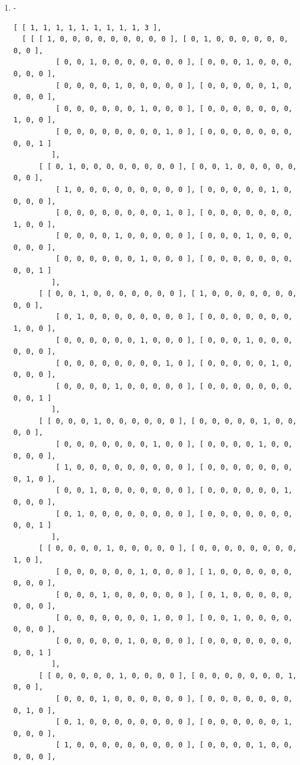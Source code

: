 \documentclass[a4paper, 10pt]{book}
\theoremstyle{definition}
\numberwithin{equation}{chapter}
\begin{document}
\begin{appendices}
\begin{enumerate}
\begin{lstlisting}[numbers=none]
          [ 0, 0, 0, 0, 0, 0, 0, 1, 0 ], [ 1, 1, 0, 0, 1, 0, 0, 0, 0 ], 
          [ 0, 0, 1, 1, 0, 0, 0, 1, 0 ] ] ] ]
	\end{lstlisting}
	\item -\begin{lstlisting}[numbers=none]
[ [ 1, 1, 1, 1, 1, 1, 1, 1, 1, 3 ], 
  [ [ [ 1, 0, 0, 0, 0, 0, 0, 0, 0, 0 ], [ 0, 1, 0, 0, 0, 0, 0, 0, 0, 0 ], 
          [ 0, 0, 1, 0, 0, 0, 0, 0, 0, 0 ], [ 0, 0, 0, 1, 0, 0, 0, 0, 0, 0 ],
          [ 0, 0, 0, 0, 1, 0, 0, 0, 0, 0 ], [ 0, 0, 0, 0, 0, 1, 0, 0, 0, 0 ],
          [ 0, 0, 0, 0, 0, 0, 1, 0, 0, 0 ], [ 0, 0, 0, 0, 0, 0, 0, 1, 0, 0 ],
          [ 0, 0, 0, 0, 0, 0, 0, 0, 1, 0 ], [ 0, 0, 0, 0, 0, 0, 0, 0, 0, 1 ] 
         ], 
      [ [ 0, 1, 0, 0, 0, 0, 0, 0, 0, 0 ], [ 0, 0, 1, 0, 0, 0, 0, 0, 0, 0 ], 
          [ 1, 0, 0, 0, 0, 0, 0, 0, 0, 0 ], [ 0, 0, 0, 0, 0, 1, 0, 0, 0, 0 ],
          [ 0, 0, 0, 0, 0, 0, 0, 0, 1, 0 ], [ 0, 0, 0, 0, 0, 0, 0, 1, 0, 0 ],
          [ 0, 0, 0, 0, 1, 0, 0, 0, 0, 0 ], [ 0, 0, 0, 1, 0, 0, 0, 0, 0, 0 ],
          [ 0, 0, 0, 0, 0, 0, 1, 0, 0, 0 ], [ 0, 0, 0, 0, 0, 0, 0, 0, 0, 1 ] 
         ], 
      [ [ 0, 0, 1, 0, 0, 0, 0, 0, 0, 0 ], [ 1, 0, 0, 0, 0, 0, 0, 0, 0, 0 ], 
          [ 0, 1, 0, 0, 0, 0, 0, 0, 0, 0 ], [ 0, 0, 0, 0, 0, 0, 0, 1, 0, 0 ],
          [ 0, 0, 0, 0, 0, 0, 1, 0, 0, 0 ], [ 0, 0, 0, 1, 0, 0, 0, 0, 0, 0 ],
          [ 0, 0, 0, 0, 0, 0, 0, 0, 1, 0 ], [ 0, 0, 0, 0, 0, 1, 0, 0, 0, 0 ],
          [ 0, 0, 0, 0, 1, 0, 0, 0, 0, 0 ], [ 0, 0, 0, 0, 0, 0, 0, 0, 0, 1 ] 
         ], 
      [ [ 0, 0, 0, 1, 0, 0, 0, 0, 0, 0 ], [ 0, 0, 0, 0, 0, 1, 0, 0, 0, 0 ], 
          [ 0, 0, 0, 0, 0, 0, 0, 1, 0, 0 ], [ 0, 0, 0, 0, 1, 0, 0, 0, 0, 0 ],
          [ 1, 0, 0, 0, 0, 0, 0, 0, 0, 0 ], [ 0, 0, 0, 0, 0, 0, 0, 0, 1, 0 ],
          [ 0, 0, 1, 0, 0, 0, 0, 0, 0, 0 ], [ 0, 0, 0, 0, 0, 0, 1, 0, 0, 0 ],
          [ 0, 1, 0, 0, 0, 0, 0, 0, 0, 0 ], [ 0, 0, 0, 0, 0, 0, 0, 0, 0, 1 ] 
         ], 
      [ [ 0, 0, 0, 0, 1, 0, 0, 0, 0, 0 ], [ 0, 0, 0, 0, 0, 0, 0, 0, 1, 0 ], 
          [ 0, 0, 0, 0, 0, 0, 1, 0, 0, 0 ], [ 1, 0, 0, 0, 0, 0, 0, 0, 0, 0 ],
          [ 0, 0, 0, 1, 0, 0, 0, 0, 0, 0 ], [ 0, 1, 0, 0, 0, 0, 0, 0, 0, 0 ],
          [ 0, 0, 0, 0, 0, 0, 0, 1, 0, 0 ], [ 0, 0, 1, 0, 0, 0, 0, 0, 0, 0 ],
          [ 0, 0, 0, 0, 0, 1, 0, 0, 0, 0 ], [ 0, 0, 0, 0, 0, 0, 0, 0, 0, 1 ] 
         ], 
      [ [ 0, 0, 0, 0, 0, 1, 0, 0, 0, 0 ], [ 0, 0, 0, 0, 0, 0, 0, 1, 0, 0 ], 
          [ 0, 0, 0, 1, 0, 0, 0, 0, 0, 0 ], [ 0, 0, 0, 0, 0, 0, 0, 0, 1, 0 ],
          [ 0, 1, 0, 0, 0, 0, 0, 0, 0, 0 ], [ 0, 0, 0, 0, 0, 0, 1, 0, 0, 0 ],
          [ 1, 0, 0, 0, 0, 0, 0, 0, 0, 0 ], [ 0, 0, 0, 0, 1, 0, 0, 0, 0, 0 ],

\end{lstlisting}
\end{enumerate}
\end{appendices}
\end{document}

